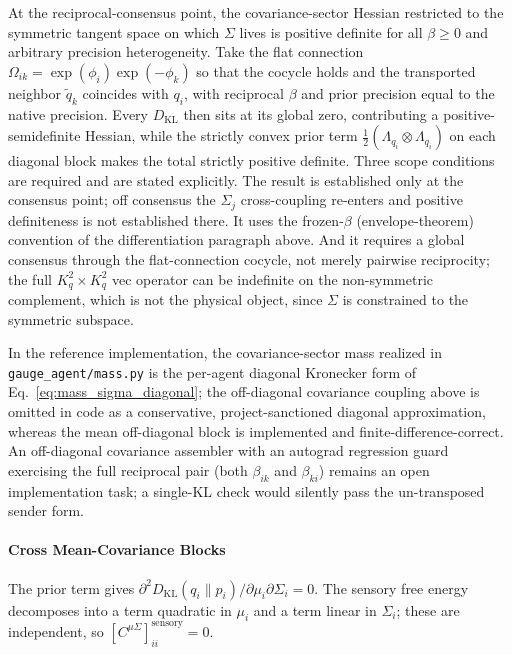 \documentclass[11pt]{article}
\begin{document}
At the reciprocal-consensus point, the covariance-sector Hessian restricted to the symmetric tangent space on which $\Sigma$ lives is positive definite for all $\beta \geq 0$ and arbitrary precision heterogeneity. Take the flat connection $\Omega_{ik} = \exp(\phi_i)\exp(-\phi_k)$ so that the cocycle holds and the transported neighbor $\tilde{q}_k$ coincides with $q_i$, with reciprocal $\beta$ and prior precision equal to the native precision. Every $D_{\mathrm{KL}}$ then sits at its global zero, contributing a positive-semidefinite Hessian, while the strictly convex prior term $\frac{1}{2}(\Lambda_{q_i} \otimes \Lambda_{q_i})$ on each diagonal block makes the total strictly positive definite. Three scope conditions are required and are stated explicitly. The result is established only at the consensus point; off consensus the $\Sigma_j$ cross-coupling re-enters and positive definiteness is not established there. It uses the frozen-$\beta$ (envelope-theorem) convention of the differentiation paragraph above. And it requires a global consensus through the flat-connection cocycle, not merely pairwise reciprocity; the full $K_q^2 \times K_q^2$ vec operator can be indefinite on the non-symmetric complement, which is not the physical object, since $\Sigma$ is constrained to the symmetric subspace.

In the reference implementation, the covariance-sector mass realized in \texttt{gauge\_agent/mass.py} is the per-agent diagonal Kronecker form of Eq.~\eqref{eq:mass_sigma_diagonal}; the off-diagonal covariance coupling above is omitted in code as a conservative, project-sanctioned diagonal approximation, whereas the mean off-diagonal block is implemented and finite-difference-correct. An off-diagonal covariance assembler with an autograd regression guard exercising the full reciprocal pair (both $\beta_{ik}$ and $\beta_{ki}$) remains an open implementation task; a single-KL check would silently pass the un-transposed sender form.

\paragraph{Cross Mean-Covariance Blocks}

The prior term gives $\partial^2 D_{\mathrm{KL}}(q_i \| p_i)/\partial \mu_i \partial \Sigma_i = 0$. The sensory free energy decomposes into a term quadratic in $\mu_i$ and a term linear in $\Sigma_i$; these are independent, so $[C^{\mu\Sigma}]_{ii}^{\mathrm{sensory}} = 0$.
\end{document}
